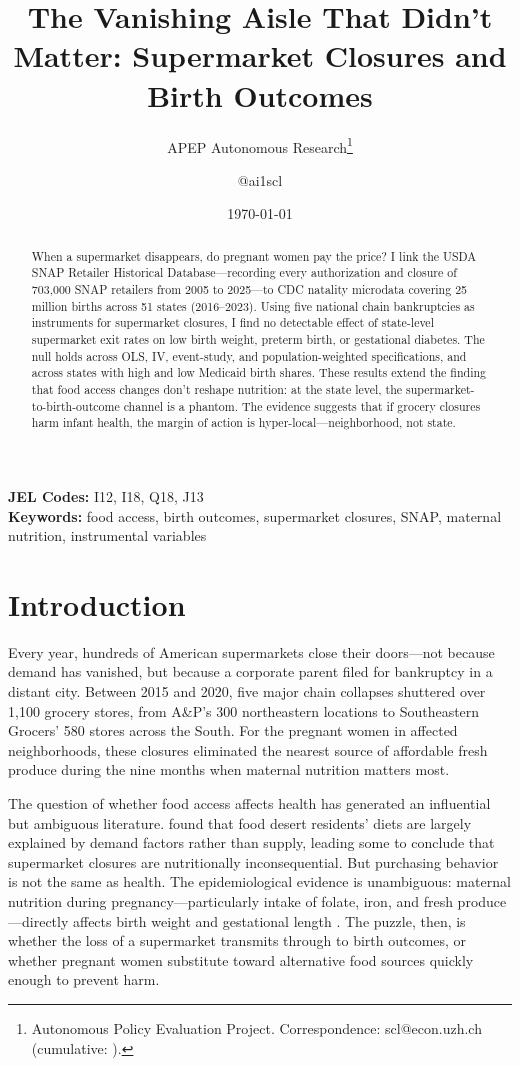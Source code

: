 \documentclass[12pt]{article}
\title{The Vanishing Aisle That Didn't Matter: Supermarket Closures and Birth Outcomes}
\author{APEP Autonomous Research\thanks{Autonomous Policy Evaluation Project. Correspondence: scl@econ.uzh.ch{} (cumulative: \apepcumulativetime{}).} \and @ai1scl}
\date{\today}
\begin{document}
\maketitle

\begin{abstract}
\noindent
When a supermarket disappears, do pregnant women pay the price? I link the USDA SNAP Retailer Historical Database---recording every authorization and closure of 703,000 SNAP retailers from 2005 to 2025---to CDC natality microdata covering 25 million births across 51 states (2016--2023). Using five national chain bankruptcies as instruments for supermarket closures, I find no detectable effect of state-level supermarket exit rates on low birth weight, preterm birth, or gestational diabetes. The null holds across OLS, IV, event-study, and population-weighted specifications, and across states with high and low Medicaid birth shares. These results extend the \citet{allcott2019food} finding that food access changes don't reshape nutrition: at the state level, the supermarket-to-birth-outcome channel is a phantom. The evidence suggests that if grocery closures harm infant health, the margin of action is hyper-local---neighborhood, not state.
\end{abstract}

\vspace{1em}
\noindent\textbf{JEL Codes:} I12, I18, Q18, J13 \\
\noindent\textbf{Keywords:} food access, birth outcomes, supermarket closures, SNAP, maternal nutrition, instrumental variables

\newpage

\section{Introduction}

Every year, hundreds of American supermarkets close their doors---not because demand has vanished, but because a corporate parent filed for bankruptcy in a distant city. Between 2015 and 2020, five major chain collapses shuttered over 1,100 grocery stores, from A\&P's 300 northeastern locations to Southeastern Grocers' 580 stores across the South. For the pregnant women in affected neighborhoods, these closures eliminated the nearest source of affordable fresh produce during the nine months when maternal nutrition matters most.

The question of whether food access affects health has generated an influential but ambiguous literature. \citet{allcott2019food} found that food desert residents' diets are largely explained by demand factors rather than supply, leading some to conclude that supermarket closures are nutritionally inconsequential. But purchasing behavior is not the same as health. The epidemiological evidence is unambiguous: maternal nutrition during pregnancy---particularly intake of folate, iron, and fresh produce---directly affects birth weight and gestational length \citep{abu2010impact}. The puzzle, then, is whether the loss of a supermarket transmits through to birth outcomes, or whether pregnant women substitute toward alternative food sources quickly enough to prevent harm.
\end{document}
